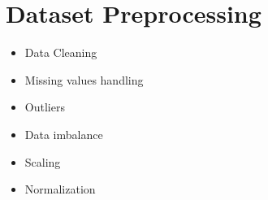 \section{Dataset Preprocessing}
\label{dataproc}

\begin{itemize}
	\item Data Cleaning
	\item Missing values handling
	\item Outliers
	\item Data imbalance
	\item Scaling
	\item Normalization
	
	
\end{itemize}



